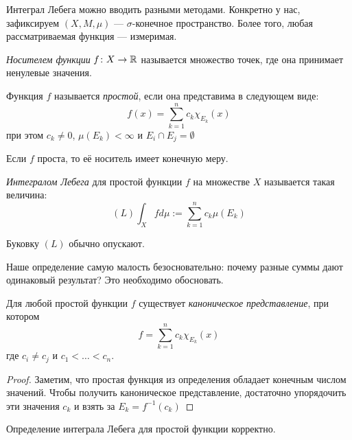 \begin{note}
	Интеграл Лебега можно вводить разными методами. Конкретно у нас, зафиксируем $(X, M, \mu)$ --- $\sigma$-конечное пространство. Более того, любая рассматриваемая функция --- измеримая.
\end{note}

\begin{definition}
	\textit{Носителем функции} $f \colon X \to \mathbb{R}$ называется множество точек, где она принимает ненулевые значения.
\end{definition}

\begin{definition}
	Функция $f$ называется \textit{простой}, если она представима в следующем виде:
	\[
		f(x) = \sum_{k = 1}^n c_k \chi_{E_k} (x)
	\]
	при этом $c_k \neq 0$, $\mu(E_k) < \infty$ и $E_i \cap E_j = \emptyset$
\end{definition}

\begin{note}
	Если $f$ проста, то её носитель имеет конечную меру.
\end{note}

\begin{definition}
	\textit{Интегралом Лебега} для простой функции $f$ на множестве $X$ называется такая величина:
	\[
		(L)\int_X fd\mu := \sum_{k = 1}^n c_k \mu(E_k)
	\]
\end{definition}

\begin{note}
	Буковку $(L)$ обычно опускают.
\end{note}

\begin{note}
	Наше определение самую малость безосновательно: почему разные суммы дают одинаковый результат? Это необходимо обосновать.
\end{note}

\begin{lemma}
	Для любой простой функции $f$ существует \textit{каноническое представление}, при котором
	\[
		f = \sum_{k = 1}^n c_k \chi_{E_k}(x)
	\]
	где $c_i \neq c_j$ и $c_1 < \ldots < c_n$.
\end{lemma}

\begin{proof}
	Заметим, что простая функция из определения обладает конечным числом значений. Чтобы получить каноническое представление, достаточно упорядочить эти значения $c_k$ и взять за $E_k = f^{-1}(c_k)$
\end{proof}

\begin{proposition}
	Определение интеграла Лебега для простой функции корректно.
\end{proposition}

